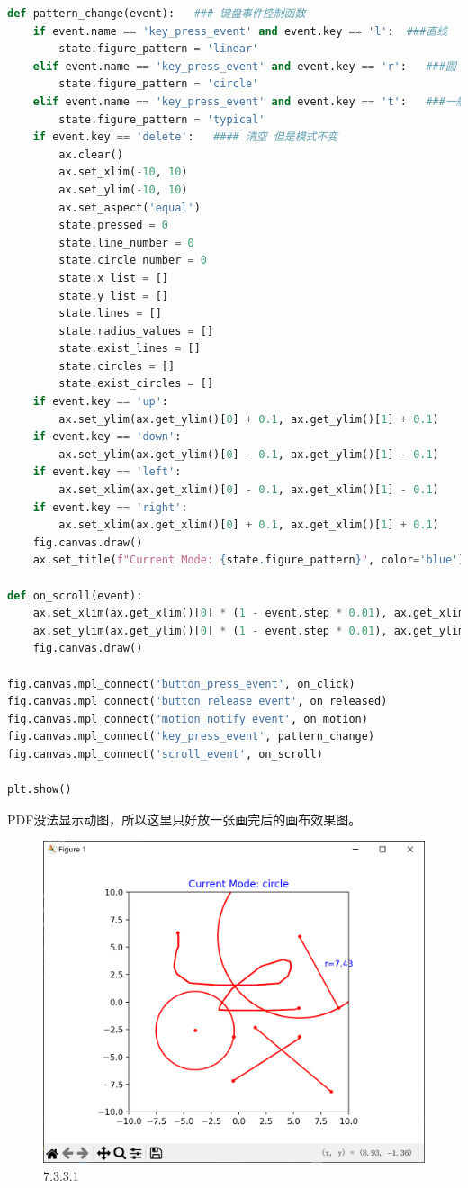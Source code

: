 \documentclass[12pt]{article}
\begin{document}
\begin{lstlisting}[language=Python]
def pattern_change(event):   ### 键盘事件控制函数
    if event.name == 'key_press_event' and event.key == 'l':  ###直线
        state.figure_pattern = 'linear'
    elif event.name == 'key_press_event' and event.key == 'r':   ###圆
        state.figure_pattern = 'circle'
    elif event.name == 'key_press_event' and event.key == 't':   ###一般曲线
        state.figure_pattern = 'typical'
    if event.key == 'delete':   #### 清空 但是模式不变
        ax.clear()
        ax.set_xlim(-10, 10)
        ax.set_ylim(-10, 10)
        ax.set_aspect('equal')
        state.pressed = 0
        state.line_number = 0
        state.circle_number = 0
        state.x_list = []
        state.y_list = []
        state.lines = []
        state.radius_values = []
        state.exist_lines = []
        state.circles = []
        state.exist_circles = []
    if event.key == 'up':
        ax.set_ylim(ax.get_ylim()[0] + 0.1, ax.get_ylim()[1] + 0.1)
    if event.key == 'down':
        ax.set_ylim(ax.get_ylim()[0] - 0.1, ax.get_ylim()[1] - 0.1)
    if event.key == 'left':
        ax.set_xlim(ax.get_xlim()[0] - 0.1, ax.get_xlim()[1] - 0.1)
    if event.key == 'right':
        ax.set_xlim(ax.get_xlim()[0] + 0.1, ax.get_xlim()[1] + 0.1)
    fig.canvas.draw()
    ax.set_title(f"Current Mode: {state.figure_pattern}", color='blue')

def on_scroll(event):
    ax.set_xlim(ax.get_xlim()[0] * (1 - event.step * 0.01), ax.get_xlim()[1] * (1 - event.step * 0.01))
    ax.set_ylim(ax.get_ylim()[0] * (1 - event.step * 0.01), ax.get_ylim()[1] * (1 - event.step * 0.01))
    fig.canvas.draw()

fig.canvas.mpl_connect('button_press_event', on_click)
fig.canvas.mpl_connect('button_release_event', on_released)
fig.canvas.mpl_connect('motion_notify_event', on_motion)
fig.canvas.mpl_connect('key_press_event', pattern_change)
fig.canvas.mpl_connect('scroll_event', on_scroll)

plt.show()
\end{lstlisting}
PDF没法显示动图，所以这里只好放一张画完后的画布效果图。
\begin{figure}[H]
    \centering
    \includegraphics[width=0.65\linewidth]{React 大杂烩 Pic1.png}
    \caption{7.3.3.1}
    \label{fig:enter-label}
\end{figure}
\end{document}
